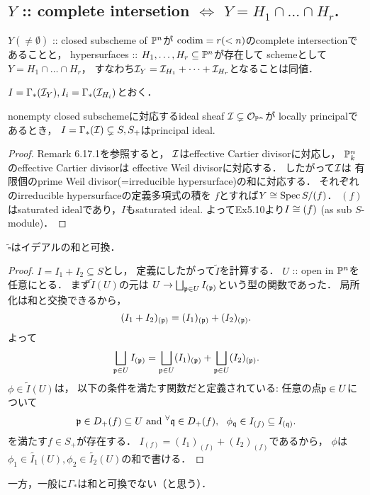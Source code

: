 \documentclass[a4paper]{jsarticle}
\begin{document}
    \subsection{$Y$ :: complete intersetion $\iff$ $Y=H_1\cap\dots\cap H_r$.}
    \begin{Claim}
        $Y (\neq \emptyset)$ :: closed subscheme of $\mathbb{P}^n$が
        $\operatorname{codim}=r (<n)$のcomplete intersectionであることと，
        hypersurfaces :: $H_1, \dots, H_r \subseteq \mathbb{P}^n$が存在して
        schemeとして$Y=H_1 \cap\dots\cap H_r$，
        すなわち$\mathcal{I}_Y=\mathcal{I}_{H_1}+\dots+\mathcal{I}_{H_r}$となることは同値．
    \end{Claim}
    $I=\Gamma_*(\mathcal{I}_Y), I_i=\Gamma_*(\mathcal{I}_{H_i})$とおく．

    \begin{Lemma}
        nonempty closed subschemeに対応するideal sheaf
        $\mathcal{I} \subsetneq \mathcal{O}_{\mathbb{P}^n}$が
        locally principalであるとき，
        $I=\Gamma_*(\mathcal{I}) \subsetneq S, S_+$はprincipal ideal.
    \end{Lemma}
    \begin{proof}
        Remark 6.17.1を参照すると，
        $\mathcal{I}$はeffective Cartier divisorに対応し，
        $\mathbb{P}^n_k$のeffective Cartier divisorは
        effective Weil divisorに対応する．
        したがって$\mathcal{I}$は
        有限個のprime Weil divisor(=irreducible hypersurface)の和に対応する．
        それぞれのirreducible hypersurfaceの定義多項式の積を
        $f$とすれば$Y \cong \operatorname{Spec} S/(f)$．
        $(f)$はsaturated idealであり，$I$もsaturated ideal.
        よってEx5.10より$I \cong (f)$ (as sub $S$-module)．
    \end{proof}

    \begin{Lemma}
        $\tilde{\square}$はイデアルの和と可換．
    \end{Lemma}
    \begin{proof}
        $I=I_1+I_2 \subseteq S$とし，
        定義にしたがって$\tilde{I}$を計算する．
        $U$ :: open in $\mathbb{P}^n$を任意にとる．
        まず$\tilde{I}(U)$の元は
        $U \to \bigsqcup_{\mathfrak{p} \in U} I_{(\mathfrak{p})}$という型の関数であった．
        局所化は和と交換できるから，
        \[ (I_1+I_2)_{(\mathfrak{p})}=(I_1)_{(\mathfrak{p})}+(I_2)_{(\mathfrak{p})}. \]
        よって
        \[
            \bigsqcup_{\mathfrak{p} \in U} I_{(\mathfrak{p})}
            =
            \bigsqcup_{\mathfrak{p} \in U}(I_1)_{(\mathfrak{p})}
            +\bigsqcup_{\mathfrak{p} \in U}(I_2)_{(\mathfrak{p})}.
        \]
        $\phi \in \tilde{I}(U)$は，
        以下の条件を満たす関数だと定義されている:
        任意の点$\mathfrak{p} \in U$について
        \[
            \mathfrak{p} \in D_+(f) \subseteq U
            \text{ and }
            {}^{\forall} \mathfrak{q} \in D_+(f),~~
                \phi_{\mathfrak{q}} \in I_{(f)} \subseteq I_{(\mathfrak{q})}.
        \]
        を満たす$f \in S_+$が存在する．
        $I_{(f)}=(I_1)_{(f)}+(I_2)_{(f)}$であるから，
        $\phi$は
        $\phi_1 \in \tilde{I_1}(U), \phi_2 \in \tilde{I_2}(U)$の和で書ける．
    \end{proof}
    一方，一般に$\Gamma_*$は和と可換でない（と思う）．
\end{document}
